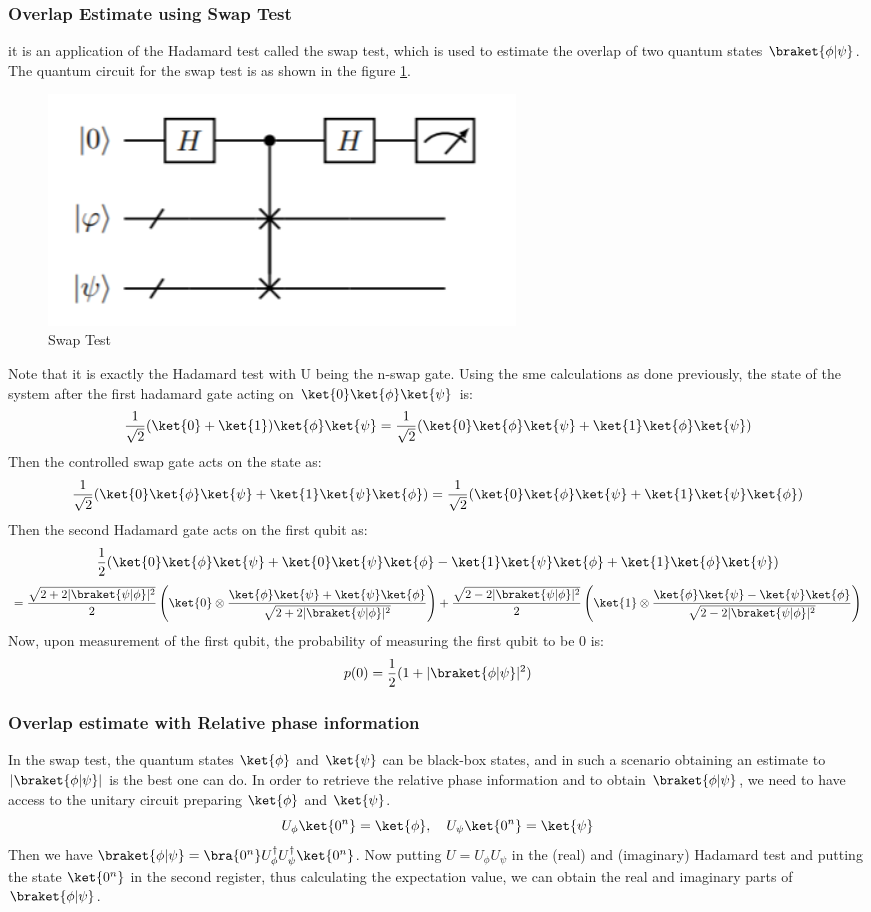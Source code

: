 \documentclass[12pt, oneside]{book}
\theoremstyle{definition}
\theoremstyle{definition}
\theoremstyle{remark}
\begin{document}
\subsubsection{Overlap Estimate using Swap Test}
it is an application of the Hadamard test called the swap test, which is used to estimate the overlap of two quantum states
$\braket{\phi|\psi}$. The quantum circuit for the swap test is as shown in the figure \ref{fig:swaptest}.
\begin{figure}[H]
    \centering
    \includegraphics[width=0.6\textwidth]{../images/swaptest.png}
    \caption{Swap Test}
    \label{fig:swaptest}
\end{figure}
Note that it is exactly the Hadamard test with U being the n-swap gate.
Using the sme calculations as done previously, the state of the system after the first hadamard gate acting on
$\ket{0}\ket{\phi}\ket{\psi}$ is:
\[
\frac{1}{\sqrt{2}}(\ket{0}+\ket{1})\ket{\phi}\ket{\psi}=\frac{1}{\sqrt{2}}(\ket{0}\ket{\phi}\ket{\psi}+\ket{1}\ket{\phi}\ket{\psi})
\]
Then the controlled swap gate acts on the state as:
\[
\frac{1}{\sqrt{2}}(\ket{0}\ket{\phi}\ket{\psi}+\ket{1}\ket{\psi}\ket{\phi})=\frac{1}{\sqrt{2}}(\ket{0}\ket{\phi}\ket{\psi}+\ket{1}\ket{\psi}\ket{\phi})
\]
Then the second Hadamard gate acts on the first qubit as:
\[
\frac{1}{2}(\ket{0}\ket{\phi}\ket{\psi}+\ket{0}\ket{\psi}\ket{\phi}-\ket{1}\ket{\psi}\ket{\phi}+\ket{1}\ket{\phi}\ket{\psi})
\]
\[
=\frac{\sqrt{2+2|\braket{\psi|\phi}|^2}}{2}\left(\ket{0}\otimes\frac{\ket{\phi}\ket{\psi}+\ket{\psi}\ket{\phi}}{\sqrt{2+2|\braket{\psi|\phi}|^2}}\right) +\frac{\sqrt{2-2|\braket{\psi|\phi}|^2}}{2}\left(\ket{1}\otimes\frac{\ket{\phi}\ket{\psi}-\ket{\psi}\ket{\phi}}{\sqrt{2-2|\braket{\psi|\phi}|^2}}\right)
\]
Now, upon measurement of the first qubit, the probability of measuring the first qubit to be 0 is:
\[
p(0)=\frac{1}{2}(1+|\braket{\phi|\psi}|^2)
\]


\subsubsection{Overlap estimate with Relative phase information}
In the swap test, the quantum states $\ket{\phi}$ and $\ket{\psi}$ can be black-box states, and in 
such a scenario obtaining an estimate to $|\braket{\phi|\psi}|$ is the best one can do.
In order to retrieve the relative phase information and to obtain $\braket{\phi|\psi}$, we need to have access to the 
unitary circuit preparing $\ket{\phi}$ and $\ket{\psi}$.
\[
U_{\phi}\ket{0^n}=\ket{\phi}, \quad U_{\psi}\ket{0^n}=\ket{\psi}
\]
Then we have $\braket{\phi|\psi}=\bra{0^n}U_{\phi}^{\dagger}U_{\psi}^{\dagger}\ket{0^n}$.
Now putting $U=U_{\phi}U_{\psi}$ in the (real) and (imaginary) Hadamard test and putting the state 
$\ket{0^n}$ in the second register, thus calculating the expectation value,
we can obtain the real and imaginary parts of $\braket{\phi|\psi}$.
\end{document}

